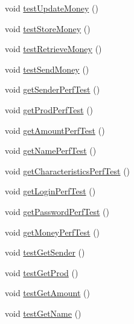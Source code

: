 \begin{DoxyCompactItemize}
\item 
void \hyperlink{classes_1_1deusto_1_1server_1_1_j_unit_test_aaad8cae59ca19f9dba654a12f695dbd0}{test\+Update\+Money} ()
\item 
void \hyperlink{classes_1_1deusto_1_1server_1_1_j_unit_test_a6863eca45b97fd4cce293b9ee705da6f}{test\+Store\+Money} ()
\item 
void \hyperlink{classes_1_1deusto_1_1server_1_1_j_unit_test_acd22c583e2d8276c76df148ddca3d716}{test\+Retrieve\+Money} ()
\item 
void \hyperlink{classes_1_1deusto_1_1server_1_1_j_unit_test_a3d96e27fee6cffb14a0f43b9516c9eb9}{test\+Send\+Money} ()
\item 
void \hyperlink{classes_1_1deusto_1_1server_1_1_j_unit_test_a46253683d4cd22c6501825f126973410}{get\+Sender\+Perf\+Test} ()
\item 
void \hyperlink{classes_1_1deusto_1_1server_1_1_j_unit_test_a1a7020b294376615f6e970c8f333413d}{get\+Prod\+Perf\+Test} ()
\item 
void \hyperlink{classes_1_1deusto_1_1server_1_1_j_unit_test_af8d8ab1be153c202fa1b5210c289cf9e}{get\+Amount\+Perf\+Test} ()
\item 
void \hyperlink{classes_1_1deusto_1_1server_1_1_j_unit_test_af00ff9ebc78b3084cae01b1dc17deac1}{get\+Name\+Perf\+Test} ()
\item 
void \hyperlink{classes_1_1deusto_1_1server_1_1_j_unit_test_a2d03b70c2755220640f1faf9187ff0eb}{get\+Characteristics\+Perf\+Test} ()
\item 
void \hyperlink{classes_1_1deusto_1_1server_1_1_j_unit_test_acc60e1b0408897890a68f8a3e8e7e0f1}{get\+Login\+Perf\+Test} ()
\item 
void \hyperlink{classes_1_1deusto_1_1server_1_1_j_unit_test_a044b003f52f432938d9fee7189f0c7bb}{get\+Password\+Perf\+Test} ()
\item 
void \hyperlink{classes_1_1deusto_1_1server_1_1_j_unit_test_ac6a5f7176a83d86cc6a08663f1552f30}{get\+Money\+Perf\+Test} ()
\item 
void \hyperlink{classes_1_1deusto_1_1server_1_1_j_unit_test_a7f488e3ee6b4751aaffd8ac74edc828d}{test\+Get\+Sender} ()
\item 
void \hyperlink{classes_1_1deusto_1_1server_1_1_j_unit_test_a545a0934031db41d9333d9106c050ae4}{test\+Get\+Prod} ()
\item 
void \hyperlink{classes_1_1deusto_1_1server_1_1_j_unit_test_aad5e9f503b6938b10c7935af68ae99fa}{test\+Get\+Amount} ()
\item 
void \hyperlink{classes_1_1deusto_1_1server_1_1_j_unit_test_a9e4938a911e40d6f36531639482d09a8}{test\+Get\+Name} ()

\end{DoxyCompactItemize}
